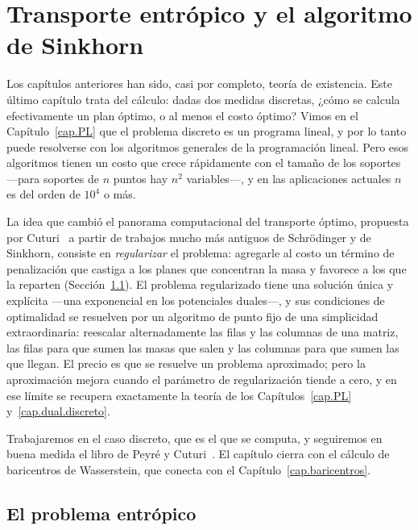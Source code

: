\documentclass[12pt, a4paper]{amsbook}
\theoremstyle{remark}
\theoremstyle{definition}
\numberwithin{section}{chapter}
\numberwithin{subsection}{section}
\numberwithin{equation}{section}
\numberwithin{figure}{chapter}
\begin{document}
\chapter{Transporte entrópico y el algoritmo de Sinkhorn}\label{cap.Sinkhorn}

Los capítulos anteriores han sido, casi por completo, teoría de existencia.
Este último capítulo trata del cálculo: dadas dos medidas discretas, ¿cómo
se calcula efectivamente un plan óptimo, o al menos el costo óptimo? Vimos en
el Capítulo~\ref{cap.PL} que el problema discreto es un programa lineal, y
por lo tanto puede resolverse con los algoritmos generales de la programación
lineal. Pero esos algoritmos tienen un costo que crece rápidamente con el
tamaño de los soportes —para soportes de $n$ puntos hay $n^2$ variables—, y
en las aplicaciones actuales $n$ es del orden de $10^4$ o más.

La idea que cambió el panorama computacional del transporte óptimo, propuesta
por Cuturi~\cite{Cuturi2013} a partir de trabajos mucho más antiguos de
Schrödinger y de Sinkhorn, consiste en \emph{regularizar} el problema:
agregarle al costo un término de penalización que castiga a los planes que
concentran la masa y favorece a los que la reparten
(Sección~\ref{sec.entropico}). El problema regularizado tiene una solución
única y explícita —una exponencial en los potenciales duales—, y sus
condiciones de optimalidad se resuelven por un algoritmo de punto fijo de una
simplicidad extraordinaria: reescalar alternadamente las filas y las columnas
de una matriz, las filas para que sumen las masas que salen y las columnas
para que sumen las que llegan.
El precio es que se resuelve un problema aproximado; pero la aproximación
mejora cuando el parámetro de regularización tiende a cero, y en ese límite
se recupera exactamente la teoría de los Capítulos~\ref{cap.PL}
y~\ref{cap.dual.discreto}.

Trabajaremos en el caso discreto, que es el que se computa, y seguiremos en
buena medida el libro de Peyré y Cuturi~\cite{PeyreCuturi2019}. El capítulo
cierra con el cálculo de baricentros de Wasserstein, que conecta con el
Capítulo~\ref{cap.baricentros}.

\section{El problema entrópico}\label{sec.entropico}
\end{document}
